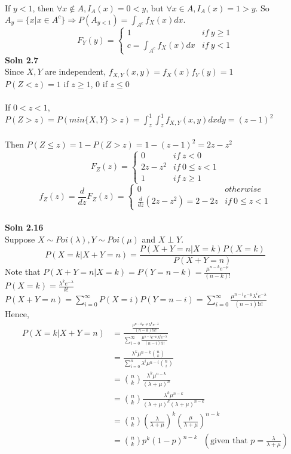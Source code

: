 \documentclass{article}
\newcommand{\SOL}[2]{%
  \textbf{Soln #1}\\%
}
\begin{document}
If $y < 1$, then $\forall x \not\in A, I_A(x) = 0 < y$, but $\forall x \in A, I_A(x)= 1 > y$.  So  $A_y = \{ x | x \in A^c \} \Rightarrow P(A_{y < 1}) = \int_{A^c} f_X(x)dx.$ \\
$$ F_Y(y) =
  \begin{cases}
  1 & if \ y \geq 1 \\
  c=\int_{A^c} f_X(x)dx & if \ y < 1
  \end{cases}
$$ 
\SOL{2.7}
\\
Since $X, Y$ are independent, $f_{X,Y} (x,y) = f_X(x)f_Y(y) = 1$  \\
$P(Z < z) = 1$ if $z \geq 1$,  0 if $z \leq 0$ \\ \\
If $0 < z < 1$, $P(Z > z) = P(min\{X, Y\} > z) = \int_z^1 \int_z^1 f_{X,Y}(x,y) dxdy = (z-1)^2$ \\ \\
Then $P(Z \leq z) = 1 - P(Z > z) = 1 - (z-1)^2 = 2z - z^2 $ \\
$$ F_Z(z) = 
	\begin{cases}
		0 & if\ z < 0 \\
		2z-z^2 & if\ 0 \leq z < 1 \\
		1 & if\  z \geq 1
	\end{cases}
$$
$$ f_Z(z) = \frac{d}{dz} F_Z(z) =
 \begin{cases}
   0 & otherwise \\
   \frac{d}{dz} (2z - z^2) = 2 - 2z & if\ 0\leq z < 1
 \end{cases}
$$
\\
\SOL{2.16}
\\
Suppose $X \sim Poi(\lambda), Y \sim Poi(\mu)$ and $X \perp Y$. \\
$$P(X=k|X+Y=n) = \frac{P(X+Y=n| X=k)P(X=k)}{P(X+Y = n)} $$
Note that $P(X+Y=n| X=k) =P(Y=n-k) = \frac{\mu^{n-k}e^{-\mu}}{(n-k)!}$ \\
$P(X=k) = \frac{\lambda^k e^{-\lambda}}{k!}$ \\
$P(X+Y=n) = \sum^{\infty}_{i = 0} P(X=i)P(Y=n-i) =  \sum^{\infty}_{i = 0}\frac{\mu^{n-i}e^{-\mu} \lambda^i e^{-\lambda}}{(n-i)!i!}$ \\
Hence, 
\begin{align*}
P(X=k|X+Y=n) &= \frac{ \frac{\mu^{n-k}e^{-\mu} \lambda^k e^{-\lambda}}{(n-k)!k!} }{\sum^{\infty}_{i = 0}\frac{\mu^{n-i}e^{-\mu} \lambda^i e^{-\lambda}}{(n-i)!i!}} \\
&= \frac{ \lambda^{k} \mu^{n-k} \binom{n}{k}}{ \sum^{n}_{i=0} \lambda^{i} \mu^{n-i} \binom{n}{i}} \\
&=  \binom{n}{k} \frac{ \lambda^{k} \mu^{n-k}}{ (\lambda + \mu)^n} \\
&=  \binom{n}{k} \frac{ \lambda^{k} \mu^{n-k}}{ (\lambda + \mu)^k (\lambda + \mu)^{n-k}} \\
&=  \binom{n}{k} \left(\frac{\lambda}{\lambda + \mu} \right)^k  \left(\frac{\mu}{\lambda + \mu} \right)^{n-k}  \\
&=  \binom{n}{k} p^k (1-p)^{n-k} \ \ \ (\mbox{given that } p = \frac{\lambda}{\lambda + \mu} )
\end{align*}
\\
\end{document}

